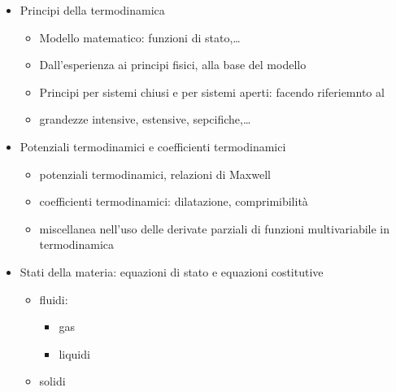 \documentclass[letterpaper,10pt,english]{jupyterBook}
\begin{document}
\sphinxAtStartPar
{}
\begin{itemize}
\item {} 
\sphinxAtStartPar
Principi della termodinamica
\begin{itemize}
\item {} 
\sphinxAtStartPar
Modello matematico: funzioni di stato,…

\item {} 
\sphinxAtStartPar
Dall’esperienza ai principi fisici, alla base del modello

\item {} 
\sphinxAtStartPar
Principi per sistemi chiusi e per sistemi aperti: facendo riferiemnto al 

\item {} 
\sphinxAtStartPar
grandezze intensive, estensive, sepcifiche,…

\end{itemize}

\item {} 
\sphinxAtStartPar
Potenziali termodinamici e coefficienti termodinamici
\begin{itemize}
\item {} 
\sphinxAtStartPar
potenziali termodinamici, relazioni di Maxwell

\item {} 
\sphinxAtStartPar
coefficienti termodinamici: dilatazione, comprimibilità

\item {} 
\sphinxAtStartPar
miscellanea nell’uso delle derivate parziali di funzioni multi\sphinxhyphen{}variabile in termodinamica

\end{itemize}

\item {} 
\sphinxAtStartPar
Stati della materia: equazioni di stato e equazioni costitutive
\begin{itemize}
\item {} 
\sphinxAtStartPar
fluidi:
\begin{itemize}
\item {} 
\sphinxAtStartPar
gas

\item {} 
\sphinxAtStartPar
liquidi

\end{itemize}

\item {} 
\sphinxAtStartPar
solidi


\end{itemize}
\end{itemize}
\end{document}
